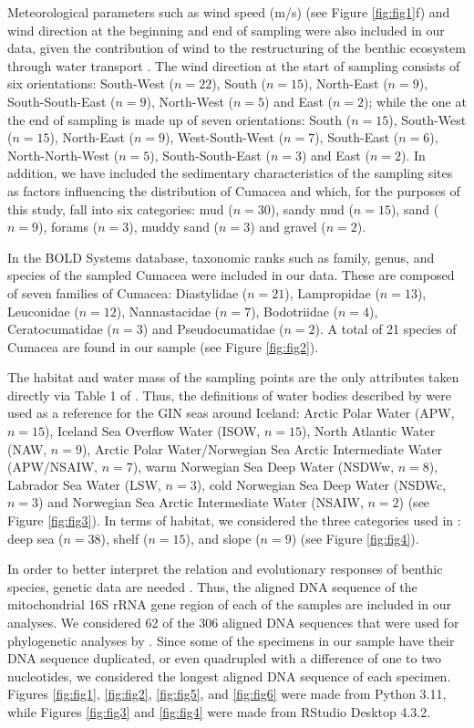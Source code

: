 Meteorological parameters such as wind speed (m/s) (see Figure \ref{fig:fig1}f) and wind direction at the beginning and end of sampling were also included in our data, given the contribution of wind to the restructuring of the benthic ecosystem through water transport \citep{waga_recent_2020,saeedi_environmental_2022}. The wind direction at the start of sampling consists of six orientations: South-West ($n=22$), South ($n=15$), North-East ($n=9$), South-South-East ($n=9$), North-West ($n=5$) and East ($n=2$); while the one at the end of sampling is made up of seven orientations: South ($n=15$), South-West ($n=15$), North-East ($n=9$), West-South-West ($n=7$), South-East ($n=6$), North-North-West ($n=5$), South-South-East ($n=3$) and East ($n=2$). In addition, we have included the sedimentary characteristics of the sampling sites as factors influencing the distribution of Cumacea \citep{uhlir_adding_2021} and which, for the purposes of this study, fall into six categories: mud ($n=30$), sandy mud ($n=15$), sand ($n=9$), forams ($n=3$), muddy sand ($n=3$) and gravel ($n=2$).

In the BOLD Systems database, taxonomic ranks such as family, genus, and species of the sampled Cumacea were included in our data. These are composed of seven families of Cumacea: Diastylidae ($n=21$), Lampropidae ($n=13$), Leuconidae ($n=12$), Nannastacidae ($n=7$), Bodotriidae ($n=4$), Ceratocumatidae ($n=3$) and Pseudocumatidae ($n=2$). A total of 21 species of Cumacea are found in our sample (see Figure \ref{fig:fig2}).

The habitat and water mass of the sampling points are the only attributes taken directly via Table 1 of \cite{uhlir_adding_2021}. Thus, the definitions of water bodies described by \cite{hansen_north_2000,brix2010distribution,ostmann_marine_2014} were used as a reference for the GIN seas around Iceland: Arctic Polar Water (APW, $n=15$), Iceland Sea Overflow Water (ISOW, $n=15$), North Atlantic Water (NAW, $n=9$), Arctic Polar Water/Norwegian Sea Arctic Intermediate Water (APW/NSAIW, $n=7$), warm Norwegian Sea Deep Water (NSDWw, $n=8$), Labrador Sea Water (LSW, $n=3$), cold Norwegian Sea Deep Water (NSDWc, $n=3$) and Norwegian Sea Arctic Intermediate Water (NSAIW, $n=2$) (see Figure \ref{fig:fig3}). In terms of habitat, we considered the three categories used in \cite{uhlir_adding_2021}: deep sea ($n=38$), shelf ($n=15$), and slope ($n=9$) (see Figure \ref{fig:fig4}).

In order to better interpret the relation and evolutionary responses of benthic species, genetic data are needed \citep{wilson_speciation_1987,uhlir_adding_2021}. Thus, the aligned DNA sequence of the mitochondrial 16S rRNA gene region of each of the samples are included in our analyses. We considered 62 of the 306 aligned DNA sequences that were used for phylogenetic analyses by \cite{uhlir_adding_2021}. Since some of the specimens in our sample have their DNA sequence duplicated, or even quadrupled with a difference of one to two nucleotides, we considered the longest aligned DNA sequence of each specimen. Figures \ref{fig:fig1}, \ref{fig:fig2}, \ref{fig:fig5}, and \ref{fig:fig6} were made from Python 3.11, while Figures \ref{fig:fig3} and \ref{fig:fig4} were made from RStudio Desktop 4.3.2.

